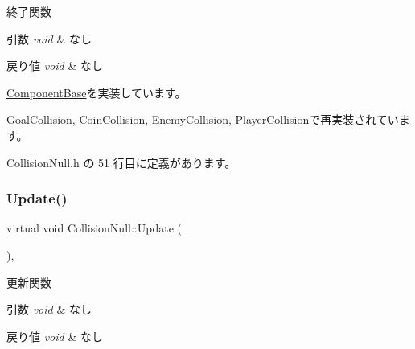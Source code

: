 終了関数 


\begin{DoxyParams}{引数}
{\em void} & なし \\
\hline
\end{DoxyParams}

\begin{DoxyRetVals}{戻り値}
{\em void} & なし \\
\hline
\end{DoxyRetVals}


\mbox{\hyperlink{class_component_base_a9f42beaf0383d6f629819579cab4de57}{Component\+Base}}を実装しています。



\mbox{\hyperlink{class_goal_collision_ab818bad44ffcd595f1c495e659c0b348}{Goal\+Collision}}, \mbox{\hyperlink{class_coin_collision_aa852afdcdbedcf82809df9c7fd99be9e}{Coin\+Collision}}, \mbox{\hyperlink{class_enemy_collision_a2a194c606fd162db803c70c6fed9b9e4}{Enemy\+Collision}}, \mbox{\hyperlink{class_player_collision_aa1ab60a62fa2ae3231a1ea0bc8faf801}{Player\+Collision}}で再実装されています。



 Collision\+Null.\+h の 51 行目に定義があります。

\mbox{\label{class_collision_null_a5e5e094e3fbe3ccc0515e485c739bd15}} 
\subsubsection{\texorpdfstring{Update()}{Update()}}
{\footnotesize\ttfamily virtual void Collision\+Null\+::\+Update (\begin{DoxyParamCaption}{ }\end{DoxyParamCaption})\hspace{0.3cm}{\ttfamily [inline]}, {\ttfamily [virtual]}}



更新関数 


\begin{DoxyParams}{引数}
{\em void} & なし \\
\hline
\end{DoxyParams}

\begin{DoxyRetVals}{戻り値}
{\em void} & なし \\
\hline
\end{DoxyRetVals}


